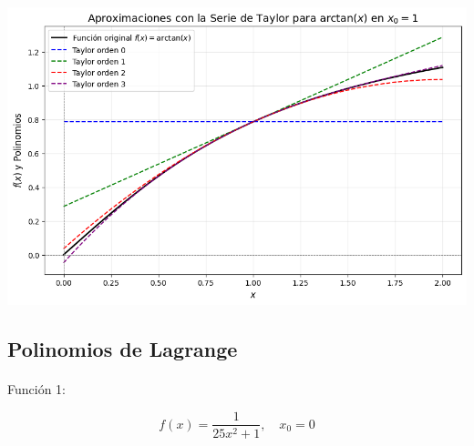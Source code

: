 \documentclass[
  letterpaper,
  DIV=11,
  numbers=noendperiod]{scrartcl}
\makeatletter
\let\oldparagraph\paragraph
\renewcommand{\paragraph}{
    \@ifstar
      \xxxParagraphStar
      \xxxParagraphNoStar
  }
\newcommand{\xxxParagraphStar}[1]{\oldparagraph*{#1}\mbox{}}
\newcommand{\xxxParagraphNoStar}[1]{\oldparagraph{#1}\mbox{}}
\makeatother
\begin{document}
\includegraphics{Deber6_files/figure-pdf/cell-3-output-1.png}

\subsection{Polinomios de Lagrange}\label{polinomios-de-lagrange}

\paragraph{Función 1:}\label{funciuxf3n-1-1}

\[
f(x) = \frac{1}{25x^2 + 1}, \quad x_0 = 0
\]
\end{document}
